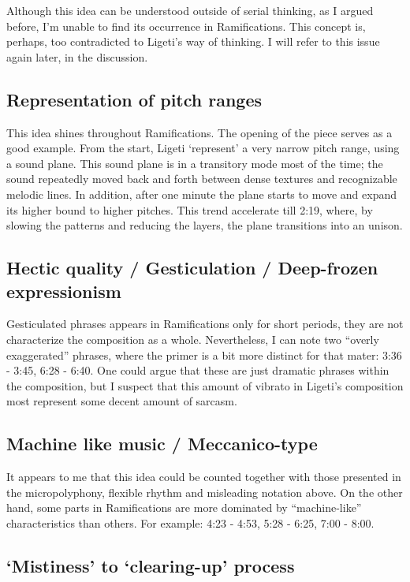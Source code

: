 \documentclass[a4paper,11pt]{article}
\begin{document}
Although this idea can be understood outside of serial thinking, as I argued before, I'm unable to find its occurrence in Ramifications.
This concept is, perhaps, too contradicted to Ligeti's way of thinking.
I will refer to this issue again later, in the discussion.

\subsection*{Representation of pitch ranges}

This idea shines throughout Ramifications.
The opening of the piece serves as a good example.
From the start, Ligeti `represent' a very narrow pitch range, using a sound plane.
This sound plane is in a transitory mode most of the time;
the sound repeatedly moved back and forth between dense textures and recognizable melodic lines.
In addition, after one minute the plane starts to move and expand its higher bound to higher pitches.
This trend accelerate till 2:19, where, by slowing the patterns and reducing the layers, the plane transitions into an unison.

\subsection*{Hectic quality / Gesticulation / Deep-frozen expressionism}

Gesticulated phrases appears in Ramifications only for short periods, they are not characterize the composition as a whole.
Nevertheless, I can note two ``overly exaggerated'' phrases, where the primer is a bit more distinct for that mater: 3:36 - 3:45, 6:28 - 6:40.
One could argue that these are just dramatic phrases within the composition, but I suspect that this amount of vibrato in Ligeti's composition most represent some decent amount of sarcasm.

\subsection*{Machine like music / Meccanico-type}

It appears to me that this idea could be counted together with those presented in the micropolyphony, flexible rhythm and misleading notation above.
On the other hand, some parts in Ramifications are more dominated by ``machine-like'' characteristics than others.
For example: 4:23 - 4:53, 5:28 - 6:25, 7:00 - 8:00.

\subsection*{‘Mistiness’ to ‘clearing-up’ process}
\end{document}
